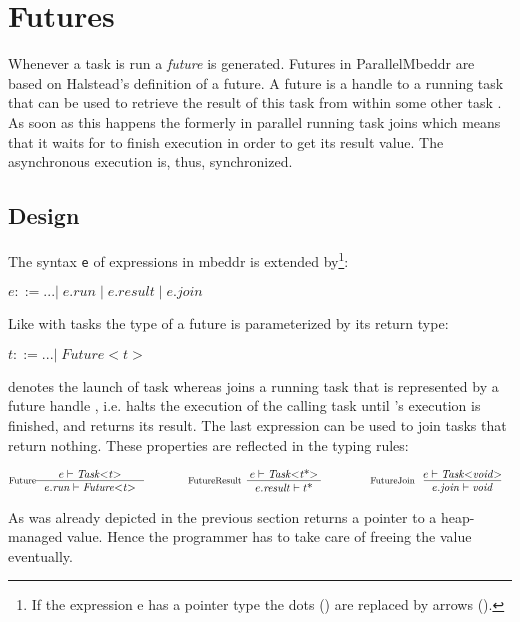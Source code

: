 \section{Futures}
Whenever a task  is run a \textit{future} is generated. Futures in ParallelMbeddr are based on Halstead's definition of a future\cite{Halstead_Multilisp}. A future is a handle to a running task that can be used to retrieve the result of this task from within some other task . As soon as this happens the formerly in parallel running task  joins  which means that it waits for  to finish execution in order to get its result value. The asynchronous execution is, thus, synchronized.

\subsection{Design}
The syntax \texttt{e} of expressions in mbeddr is extended by\footnote{If the expression e has a pointer type the dots () are replaced by arrows (\CODE{->}).}:

$ e ::= ...|\;e.\mathit{run}\;|\;e.\mathit{result}\;|\;e.\mathit{join} $

Like with tasks the type of a future is parameterized by its return type:

$ t ::= ...|\;\mathit{Future{<}t{>}}$

 denotes the launch of task  whereas  joins a running task that is represented by a future handle , i.e. halts the execution of the calling task until 's execution is finished, and returns its result. The last expression  can be used to join tasks that return nothing. %
These properties are reflected in the typing rules:

\begin{center}
\begin{align*}
\inference*[Future]{e |- \mathit{Task{<}t{>}}}{e.\mathit{run} |- \mathit{Future{<}t{>}}}
\qquad\qquad
\inference*[FutureResult]{e |- \mathit{Task{<}t\text{*}{>}}}{e.\mathit{result} |- t\text{*}}
\qquad\qquad
\inference*[FutureJoin]{e |- \mathit{Task{<}void{>}}}{e.\mathit{join} |- \mathit{void}}
\end{align*}
\end{center}

As was already depicted in the previous section  
 returns a pointer to a heap-managed value. Hence the programmer has to take care of freeing the value eventually.

